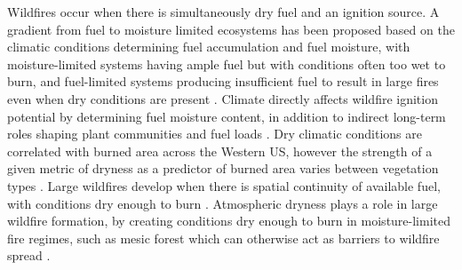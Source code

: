 \documentclass[11p]{article}
\begin{document}
Wildfires occur when there is simultaneously dry fuel and an ignition source. A gradient from fuel to moisture limited ecosystems has been proposed based on the climatic conditions determining fuel accumulation and fuel moisture, with moisture-limited systems having ample fuel but with conditions often too wet to burn, and fuel-limited systems producing insufficient fuel to result in large fires even when dry conditions are present \citep{meynEnvironmentalDriversLarge2007}. Climate directly affects wildfire ignition potential by determining fuel moisture content, in addition to indirect long-term roles shaping plant communities and fuel loads \citep{littellReviewRelationshipsDrought2016}. Dry climatic conditions are correlated with burned area across the Western US, however the strength of a given metric of dryness as a predictor of burned area varies between vegetation types \citep{littellClimateWildfireArea2009}. Large wildfires develop when there is spatial continuity of available fuel, with conditions dry enough to burn %
\citep{millerConnectivityForestFuels2000}. Atmospheric dryness plays a role in large wildfire formation, by creating conditions dry enough to burn in moisture-limited fire regimes, such as mesic forest which can otherwise act as barriers to wildfire spread \citep{cawsonAtmosphericDrynessRemoves2024}.
\end{document}
